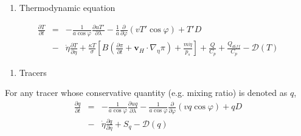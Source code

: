 \begin{enumerate}
\def\labelenumi{\arabic{enumi}.}
\setcounter{enumi}{3}
\tightlist
\item
  Thermodynamic equation
\end{enumerate}
\begin{eqnarray}
  \frac{\partial T}{\partial t}
     &=&  - \frac{1}{a\cos\varphi}
               \frac{\partial uT'}{\partial \lambda}
          - \frac{1}{a}
               \frac{\partial }{\partial \varphi} ( vT' \cos\varphi )
          + T' D \\
        &-& \dot{\eta} 
              \frac{\partial T }{\partial \eta}
          + \frac{\kappa T}{\sigma} \left[ B\left( \frac{\partial \pi}{\partial t}
                            + {\mathbf{v}}_{H} \cdot \nabla_{\eta}\pi \right)
                            + \frac{ m\dot{\eta} }{ p_s }
                     \right]
          + \frac{Q}{C_{p}}
          + \frac{Q_{diff}}{C_{p}}
          - {\mathcal D}(T) 
\end{eqnarray}

\begin{enumerate}
\def\labelenumi{\arabic{enumi}.}
\setcounter{enumi}{4}
\tightlist
\item
  Tracers
\end{enumerate}

For any tracer whose conservative quantity (e.g. mixing ratio) is denoted as \(q\),
\begin{eqnarray}
  \frac{\partial q}{\partial t}
   &=&  - \frac{1}{a\cos\varphi}
               \frac{\partial uq}{\partial \lambda}
          - \frac{1}{a\cos\varphi}
               \frac{\partial }{\partial \varphi} (vq \cos\varphi)
          + q D \\
        &-& \dot{\eta} \frac{\partial q }{\partial \eta}
          + S_{q}
          - {\mathcal D}(q) 
\end{eqnarray}

